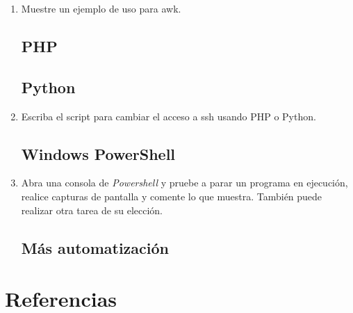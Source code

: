 \documentclass[paper=a4, fontsize=11pt]{scrartcl} %
\numberwithin{equation}{section} %
\numberwithin{figure}{section} %
\numberwithin{table}{section} %
\begin{document}
\begin{enumerate}
	
	\item Muestre un ejemplo de uso para awk.
	
	\subsection{PHP}
	\subsection{Python}
	\item Escriba el script para cambiar el acceso a ssh usando PHP o Python.
	
	\subsection{Windows PowerShell}
	\item Abra una consola de \textit{Powershell} y pruebe a parar un programa en ejecución, realice
	capturas de pantalla y comente lo que muestra. También puede realizar otra tarea de su elección.
	
	\subsection{Más automatización}
	
\end{enumerate}

\newpage
\section{Referencias}

\end{document}
